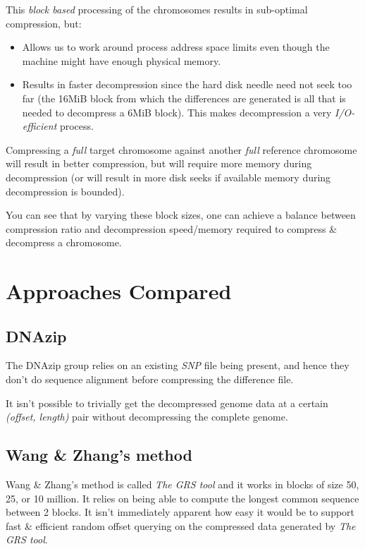 \documentclass[11pt]{article}
\begin{document}
This \textit{block based} processing of the chromosomes results in
sub-optimal compression, but:
\begin{itemize}
\item Allows us to work around process address space limits even
  though the machine might have enough physical memory.
\item Results in faster decompression since the hard disk needle need
  not seek too far (the 16MiB block from which the differences are
  generated is all that is needed to decompress a 6MiB block). This
  makes decompression a very \textit{I/O-efficient} process.
\end{itemize}

Compressing a \textit{full} target chromosome against another
\textit{full} reference chromosome will result in better compression,
but will require more memory during decompression (or will result in
more disk seeks if available memory during decompression is bounded).

You can see that by varying these block sizes, one can achieve a
balance between compression ratio and decompression speed/memory
required to compress \& decompress a chromosome.


\section{Approaches Compared}

\subsection{DNAzip}

The DNAzip group relies on an existing \textit{SNP} file being
present, and hence they don't do sequence alignment before compressing
the difference file.

It isn't possible to trivially get the decompressed genome data at a
certain \textit{(offset, length)} pair without decompressing the
complete genome.

\subsection{Wang \& Zhang's method}

Wang \& Zhang's method is called \textit{The GRS tool} and it works in
blocks of size 50, 25, or 10 million. It relies on being able to
compute the longest common sequence between 2 blocks. It isn't
immediately apparent how easy it would be to support fast \& efficient
random offset querying on the compressed data generated by \textit{The
  GRS tool}.
\end{document}
